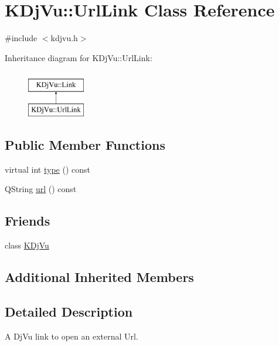 \hypertarget{classKDjVu_1_1UrlLink}{\section{K\+Dj\+Vu\+:\+:Url\+Link Class Reference}
\label{classKDjVu_1_1UrlLink}
}


{\ttfamily \#include $<$kdjvu.\+h$>$}

Inheritance diagram for K\+Dj\+Vu\+:\+:Url\+Link\+:\begin{figure}[H]
\begin{center}
\leavevmode
\includegraphics[height=2.000000cm]{classKDjVu_1_1UrlLink}
\end{center}
\end{figure}
\subsection*{Public Member Functions}
\begin{DoxyCompactItemize}
\item 
virtual int \hyperlink{classKDjVu_1_1UrlLink_a2c6a7e31c7fcf8b3cbf5b577e1d63dbf}{type} () const 
\item 
Q\+String \hyperlink{classKDjVu_1_1UrlLink_a72306f4368db17aeca1cf56cdb39f0f6}{url} () const 
\end{DoxyCompactItemize}
\subsection*{Friends}
\begin{DoxyCompactItemize}
\item 
class \hyperlink{classKDjVu_1_1UrlLink_a4241ce0336d22245ffdb13dd5cb6edcc}{K\+Dj\+Vu}
\end{DoxyCompactItemize}
\subsection*{Additional Inherited Members}


\subsection{Detailed Description}
A Dj\+Vu link to open an external Url. 

